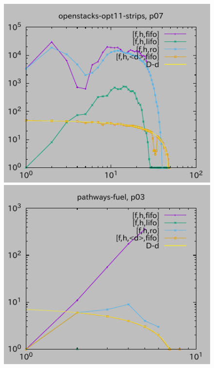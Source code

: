 \begin{figure}[tb]
\includegraphics{img/depth/openstacks-opt11-strips/p07.pdf}
\includegraphics{img/depth/pathways-fuel/p03.pdf}

\end{figure}
